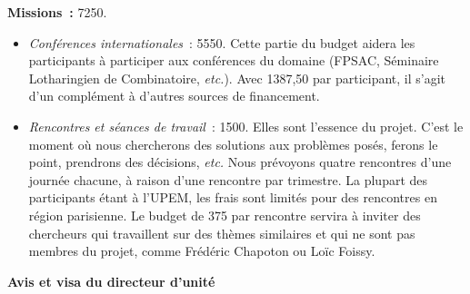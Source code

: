 \documentclass[10pt,reqno]{amsart}
\numberwithin{equation}{subsection}
\begin{document}
{\bf Missions~:} 7250\texteuro.
\begin{itemize}[fullwidth]
    \item {\em Conférences internationales}~: 5550\texteuro.
    Cette partie du budget aidera les participants à participer aux
    conférences du domaine (FPSAC, Séminaire Lotharingien de
    Combinatoire, {\em etc.}). Avec 1387,50\texteuro{} par participant,
    il s'agit d'un complément à d'autres sources de financement.

    \item {\em Rencontres et séances de travail}~: 1500\texteuro.
    Elles sont l'essence du projet. C'est le moment où nous
    chercherons des solutions aux problèmes posés, ferons le point,
    prendrons des décisions, {\em etc.} Nous prévoyons quatre
    rencontres d'une journée chacune, à raison d'une rencontre par
    trimestre. La plupart des participants étant à l'UPEM, les frais
    sont limités pour des rencontres en région parisienne. Le budget
    de 375\texteuro{} par rencontre servira à inviter des chercheurs
    qui travaillent sur des thèmes similaires et qui ne sont pas
    membres du projet, comme Frédéric Chapoton ou Loïc Foissy.
\end{itemize}



\bigskip

\Large{\bf{Avis et visa du directeur d’unité}}
\bigskip
\end{document}

